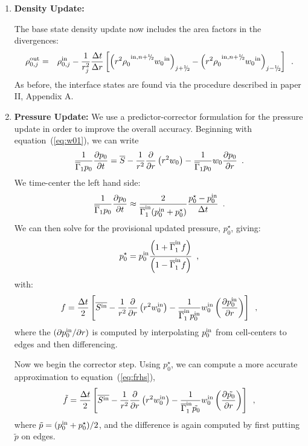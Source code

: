 \begin{enumerate}

\item {\bf Density Update:}

The base state density update now includes the area factors in the divergences:
\begin{eqnarray}
\rho_{0,j}^{\outp} &=& \rho_{0,j}^{\inp}
 - \frac{1}{r_j^2} \frac{\dt}{\dr} 
 \left [ \left( {{r^2 \rho}_0}^{\inp,\nph} {w_0}^{\inp}\right)_{j+\myhalf} -  
          \left( {{r^2 \rho}_0}^{\inp,\nph} {w_0}^{\inp}\right)_{j-\myhalf} \right]   \enskip. 
\end{eqnarray}
As before, the interface states are found via the procedure described in
paper II, Appendix A.  

\item {\bf Pressure Update:}
\newline
We use a predictor-corrector formulation for the pressure update 
in order to improve the overall accuracy.  Beginning with equation~(\ref{eq:w01}),
we can write
\begin{eqnarray*}
\frac{1}{\overline{\Gamma}_1 p_0} \frac{\partial p_0}{\partial t} = 
 \overline{S} - \frac{1}{r^2} \frac{\partial}{\partial r} \left (r^2 w_0 \right ) - \frac{1}{\overline{\Gamma}_1 p_0} w_0 \frac{\partial p_0}{\partial r} \enskip .
\end{eqnarray*}
We time-center the left hand side:
\[
\frac{1}{\overline{\Gamma}_1 p_0} \frac{\partial p_0}{\partial t} \approx
   \frac{2}{\overline{\Gamma}_1^{\mathrm{in}} (p_0^{\mathrm{in}} + p_0^{\star})} \frac{p_0^{\star} - p_0^{\mathrm{in}}}{\Delta t}\enskip.
\]
We can then solve for the provisional updated pressure, $p_0^{\star}$, giving:
\begin{equation}
p_0^{\star} = p_0^{\mathrm{in}} \frac{\left(1 + \overline{\Gamma}_1^{\mathrm{in}} f\right)}{\left(1 - \overline{\Gamma}_1^{\mathrm{in}} f\right)}\enskip,
\end{equation}
with:
\begin{equation}
f = \frac{\Delta t}{2} \left [ \overline{S^{\mathrm{in}}} -  \frac{1}{r^2} \frac{\partial}{\partial r} \left (r^2 w_0^{\mathrm{in}} \right) - 
                                             \frac{1}{\overline{\Gamma}_1^{\mathrm{in}} p_0^{\mathrm{in}}} w_0^{\mathrm{in}} \left ( \frac{\partial p_0^{\mathrm{in}}}{\partial r} \right ) \right ] \label{eq:frhs} \enskip ,
\end{equation}
where the $(\partial p_0^{\mathrm{in}} / \partial r)$ is computed by
interpolating $p_0^{\mathrm{in}}$ from cell-centers to edges and then
differencing.

Now we begin the corrector step.  Using $p_0^\star$, we can compute a more accurate approximation
to equation~(\ref{eq:frhs}),
\begin{equation}
\tilde{f} = \frac{\Delta t}{2} \left [ \overline{S^{\mathrm{in}}} -  \frac{1}{r^2} \frac{\partial}{\partial r} \left (r^2 w_0^{\mathrm{in}} \right) - 
                                             \frac{1}{\overline{\Gamma}_1^{\mathrm{in}} \tilde{p_0}} w_0^{\mathrm{in}} \left ( \frac{\partial \tilde{p_0}}{\partial r} \right ) \right ] \enskip ,
\end{equation}
where $\tilde{p} = (p_0^{\mathrm{in}} + p_0^\star)/2$, and the difference is again computed
by first putting $\tilde{p}$ on edges.


\end{enumerate}
